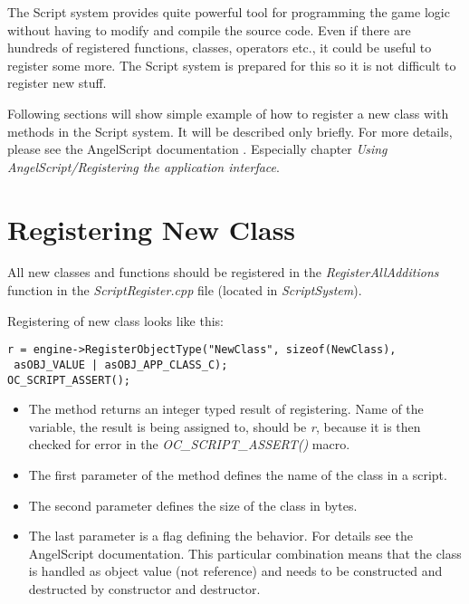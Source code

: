 \documentclass[a4paper, 12pt]{report}
\begin{document}
The Script system provides quite powerful tool for programming the game logic without having to modify and compile the source code. Even if there are hundreds of registered functions, classes, operators etc., it could be useful to register some more. The Script system is prepared for this so it is not difficult to register new stuff.

Following sections will show simple example of how to register a new class with methods in the Script system. It will be described only briefly. For more details, please see the AngelScript documentation \cite{angelscript}. Especially chapter \emph{Using AngelScript/Registering the application interface}.

\section{Registering New Class}

All new classes and functions should be registered in the \emph{RegisterAllAdditions} function in the \emph{ScriptRegister.cpp} file (located in \emph{ScriptSystem}).

Registering of new class looks like this:

\footnotesize 
\begin{verbatim}
r = engine->RegisterObjectType("NewClass", sizeof(NewClass),
 asOBJ_VALUE | asOBJ_APP_CLASS_C);
OC_SCRIPT_ASSERT();
\end{verbatim}
\normalsize

\begin{itemize}
\item
The method returns an integer typed result of registering. Name of the variable, the result is being assigned to, should be \emph{r}, because it is then checked for error in the \emph{OC\_SCRIPT\_ASSERT()} macro.

\item
The first parameter of the method defines the name of the class in a script.

\item
The second parameter defines the size of the class in bytes.

\item
The last parameter is a flag defining the behavior. For details see the AngelScript documentation. This particular combination means that the class is handled as object value (not reference) and needs to be constructed and destructed by constructor and destructor.
\end{itemize}
\end{document}
